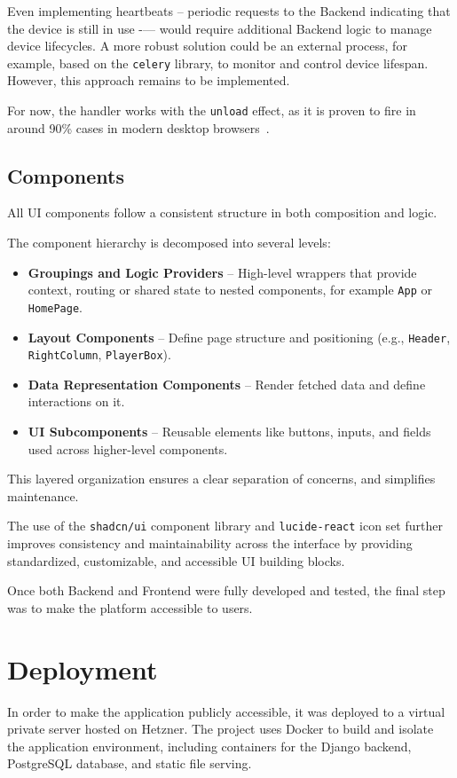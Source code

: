 Even implementing heartbeats -- periodic requests to the Backend
indicating that the device is still in use -— would require additional Backend
logic to manage device lifecycles. A more robust solution could
be an external process, for example, based on the \texttt{celery} library,
to monitor and control device lifespan.
However, this approach remains to be implemented.

For now, the handler works with the \texttt{unload} effect,
as it is proven to fire in around 90\% cases in modern
desktop browsers~\cite{beacons}.

\subsection{Components}
All UI components follow a consistent structure in both composition and logic.

The component hierarchy is decomposed into several levels:

\begin{itemize}
    \item \textbf{Groupings and Logic Providers} – High-level wrappers that provide context,
    routing or shared state to nested components, for example \texttt{App} or \texttt{HomePage}.
    \item \textbf{Layout Components} – Define page structure and positioning
    (e.g., \texttt{Header}, \texttt{RightColumn}, \texttt{PlayerBox}).
    \item \textbf{Data Representation Components} – Render fetched data and define interactions on it.
    \item \textbf{UI Subcomponents} – Reusable elements like buttons,
    inputs, and fields used across higher-level components.
\end{itemize}

This layered organization ensures a clear separation of concerns,
and simplifies maintenance.

The use of the \texttt{shadcn/ui} component library and \texttt{lucide-react}
icon set further improves consistency and maintainability
across the interface by providing standardized, customizable,
and accessible UI building blocks.


Once both Backend and Frontend were fully developed
and tested, the final step was to make the platform accessible
to users.


\section{Deployment}
In order to make the application publicly accessible,
it was deployed to a virtual private server hosted on Hetzner.
The project uses Docker to build and isolate the application environment,
including containers for the Django backend, PostgreSQL database,
and static file serving.

